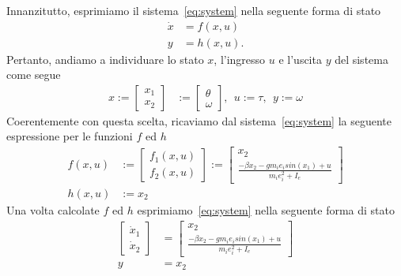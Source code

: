 \documentclass[a4paper, 11pt]{article}
\begin{document}
Innanzitutto, esprimiamo il sistema~\eqref{eq:system} nella seguente forma di stato
%
\begin{subequations}
\begin{align}\label{eq:state_form}
	\dot{x} &= f(x,u)
	\\
	y &= h(x,u).
\end{align}
\end{subequations}
%
Pertanto, andiamo a individuare lo stato $x$, l'ingresso $u$ e l'uscita $y$ del sistema come segue 
%
\begin{align*}
	x := \begin{bmatrix} 
                x_1
                \\ 
                x_2
                \end{bmatrix} &:= 
                \begin{bmatrix} 
                \theta 
                \\ 
                \omega
                \end{bmatrix}, \ \
                u := \tau, \ \ y := \omega
\end{align*}
%
Coerentemente con questa scelta, ricaviamo dal sistema~\eqref{eq:system} la seguente espressione per le funzioni $f$ ed $h$
%
\begin{align*}
	f(x,u) &:= \begin{bmatrix} f_1(x,u)
                \\ 
                f_2(x,u)
                \end{bmatrix} := 
                \begin{bmatrix} 
                x_2 
                \\ 
                \frac{-\beta x_2-g m_i e_i sin(x_1)+ u}{m_i e_i^2 + I_e} 
                \end{bmatrix}
    \\
    h(x,u) &:= x_2
\end{align*}
%
Una volta calcolate $f$ ed $h$ esprimiamo~\eqref{eq:system} nella seguente forma di stato
%
\begin{subequations}\label{eq:our_system_state_form}
\begin{align}
	\begin{bmatrix} 
        \dot x_1
        \\ 
        \dot x_2
        \end{bmatrix} &= 
        \begin{bmatrix} 
        x_2 
        \\ 
        \frac{-\beta x_2-g m_i e_i sin(x_1)+ u}{m_i e_i^2 + I_e} 
        \end{bmatrix}
        \\
        y &= x_2
\end{align}
\end{subequations}
\end{document}
